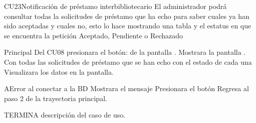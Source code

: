 
	\begin{UseCase}{CU23}{Notificación de préstamo interbibliotecario}{
		El administrador podrá consultar todas la solicitudes de préstamo que ha echo para saber cuales ya han sido aceptadas y cuales no, esto lo hace mostrando una tabla y el estatus en que se encuentra la petición Aceptado, Pendiente o Rechazado
	}
	\end{UseCase}
	\begin{UCtrayectoria}{Principal}
		\UCpaso[\UCactor] Del CU08 presionara el botón:   de la pantalla .
		\UCpaso[\UCsist]Mostrara la pantalla . Con todas las solicitudes de préstamo que se han echo con el estado de cada una
		\UCpaso[\UCactor]Visualizara los datos en la pantalla.
	\end{UCtrayectoria}
		\begin{UCtrayectoriaA}{A}{Error al conectar a la BD}
			\UCpaso[\UCsist] Mostrara el mensaje 
			\UCpaso[\UCactor] Presionara el botón 
			\UCpaso[\UCsist] Regresa al paso 2 de la trayectoria principal.
		\end{UCtrayectoriaA}
TERMINA descripción del caso de uso.

